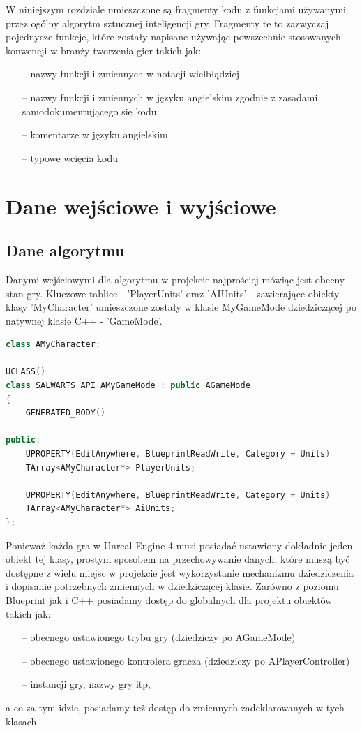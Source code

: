 \documentclass[12pt]{report}
\begin{document}
W niniejszym rozdziale umieszczone są fragmenty kodu z funkcjami używanymi przez ogólny algorytm sztucznej inteligencji gry. Fragmenty te to zazwyczaj pojednycze funkcje, które zostały napisane używając powszechnie stosowanych konwencji w branży tworzenia gier takich jak:
\begin{itemize}
\item[--] nazwy funkcji i zmiennych w notacji wielbłądziej
\item[--] nazwy funkcji i zmiennych w języku angielskim zgodnie z zasadami samodokumentującego się kodu
\item[--] komentarze w języku angielskim
\item[--] typowe wcięcia kodu
\end{itemize}

\section{Dane wejściowe i wyjściowe}
\subsection{Dane algorytmu}
Danymi wejściowymi dla algorytmu w projekcie najprościej mówiąc jest obecny stan gry. Kluczowe tablice - 'PlayerUnits' oraz 'AIUnits' - zawierające obiekty klasy 'MyCharacter' umieszczone zostały w klasie MyGameMode dziedziczącej po natywnej klasie C++ - 'GameMode'. 

\begin{lstlisting}[language=C++, backgroundcolor=\color{black!5}, basicstyle=\footnotesize, caption=Klasa AMyGameMode.h.]
   class AMyCharacter;

UCLASS()
class SALWARTS_API AMyGameMode : public AGameMode
{
	GENERATED_BODY()

public:
	UPROPERTY(EditAnywhere, BlueprintReadWrite, Category = Units)
	TArray<AMyCharacter*> PlayerUnits;

	UPROPERTY(EditAnywhere, BlueprintReadWrite, Category = Units)
	TArray<AMyCharacter*> AiUnits;
};
\end{lstlisting}



Ponieważ każda gra w Unreal Engine 4 musi posiadać ustawiony dokładnie jeden obiekt tej klasy, prostym sposobem na przechowywanie danych, które muszą być dostępne z wielu miejsc w projekcie jest wykorzystanie mechanizmu dziedziczenia i dopisanie potrzebnych zmiennych w dziedziczącej klasie. Zarówno z poziomu Blueprint jak i C++ posiadamy dostęp do globalnych dla projektu obiektów takich jak: 
\begin{itemize}
\item[--] obecnego ustawionego trybu gry (dziedziczy po AGameMode)
\item[--] obecnego ustawionego kontrolera gracza (dziedziczy po APlayerController)
\item[--] instancji gry, nazwy gry itp,
\end{itemize}
a co za tym idzie, posiadamy też dostęp do zmiennych zadeklarowanych w tych klasach. 
\end{document}
